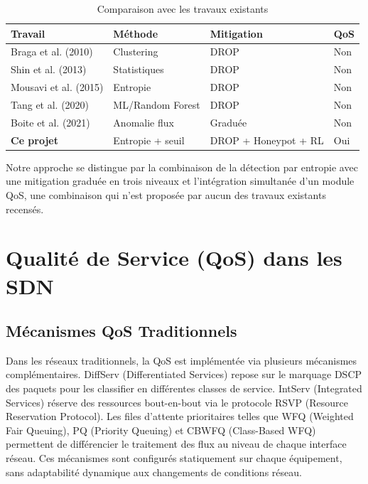 \documentclass[12pt,a4paper]{report}
\begin{document}
\begin{table}[H]
\centering
\caption{Comparaison avec les travaux existants}
\label{tab:related_work}
\begin{tabular}{llll}
\toprule
\textbf{Travail} & \textbf{Méthode} &
\textbf{Mitigation} & \textbf{QoS} \\
\midrule
Braga et al. (2010) \cite{braga2010lightweight} &
Clustering & DROP & Non \\
Shin et al. (2013) \cite{shin2013avant} &
Statistiques & DROP & Non \\
Mousavi et al. (2015) \cite{mousavi2015early} &
Entropie & DROP & Non \\
Tang et al. (2020) \cite{tang2020ddos} &
ML/Random Forest & DROP & Non \\
Boite et al. (2021) \cite{boite2021toward} &
Anomalie flux & Graduée & Non \\
\textbf{Ce projet} & Entropie + seuil &
DROP + Honeypot + RL & Oui \\
\bottomrule
\end{tabular}
\end{table}

Notre approche se distingue par la combinaison de la
détection par entropie avec une mitigation graduée en
trois niveaux et l'intégration simultanée d'un module
QoS, une combinaison qui n'est proposée par aucun des
travaux existants recensés.

\section{Qualité de Service (QoS) dans les SDN}

\subsection{Mécanismes QoS Traditionnels}
Dans les réseaux traditionnels, la QoS est implémentée
via plusieurs mécanismes complémentaires. DiffServ
(Differentiated Services) repose sur le marquage DSCP
des paquets pour les classifier en différentes classes
de service. IntServ (Integrated Services) réserve des
ressources bout-en-bout via le protocole RSVP (Resource
Reservation Protocol). Les files d'attente prioritaires
telles que WFQ (Weighted Fair Queuing), PQ (Priority
Queuing) et CBWFQ (Class-Based WFQ) permettent de
différencier le traitement des flux au niveau de chaque
interface réseau. Ces mécanismes sont configurés
statiquement sur chaque équipement, sans adaptabilité
dynamique aux changements de conditions réseau.
\end{document}

